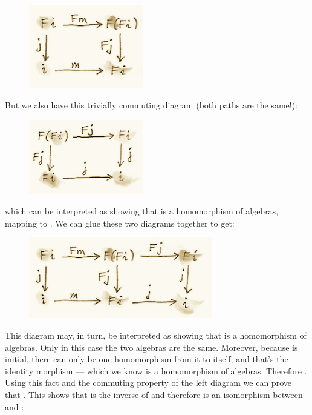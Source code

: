 \begin{figure}[H]
\centering
\includegraphics[width=50mm]{images/alg3a.png}
\end{figure}

\noindent
But we also have this trivially commuting diagram (both paths are the
same!):

\begin{figure}[H]
\centering
\includegraphics[width=50mm]{images/alg3.png}
\end{figure}

\noindent
which can be interpreted as showing that  is a homomorphism of
algebras, mapping  to . We can
glue these two diagrams together to get:

\begin{figure}[H]
\centering
\includegraphics[width=80mm]{images/alg4.png}
\end{figure}

\noindent
This diagram may, in turn, be interpreted as showing that
 is a homomorphism of algebras. Only in this case the
two algebras are the same. Moreover, because  is
initial, there can only be one homomorphism from it to itself, and
that's the identity morphism  --- which we know is a
homomorphism of algebras. Therefore . Using this
fact and the commuting property of the left diagram we can prove that
. This shows that  is the inverse of
 and therefore  is an isomorphism between
 and :

